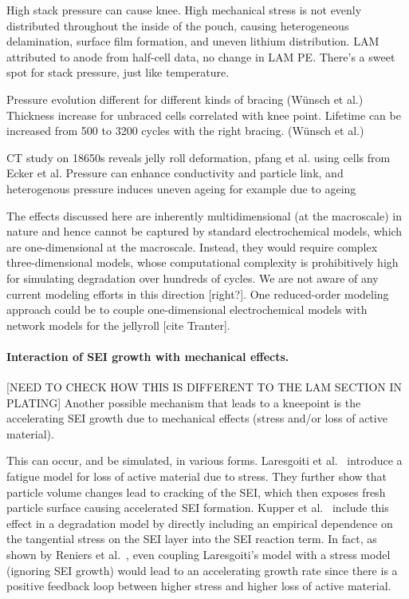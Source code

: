 \documentclass{article}
\begin{document}
High stack pressure can cause knee. High mechanical stress is not evenly distributed throughout the inside of the pouch, causing heterogeneous delamination, surface film formation, and uneven lithium distribution. LAM attributed to anode from half-cell data, no change in LAM PE. There's a sweet spot for stack pressure, just like temperature.\cite{cannarella_stress_2014}

Pressure evolution different for different kinds of bracing (Wünsch et al.) Thickness increase for unbraced cells correlated with knee point. Lifetime can be increased from 500 to 3200 cycles with the right bracing. (Wünsch et al.)

CT study on 18650s reveals jelly roll deformation, pfang et al. \cite{pfrang_long-term_2018} using cells from Ecker et al. \cite{ecker_calendar_2014}
Pressure can enhance conductivity and particle link, and heterogenous pressure induces uneven ageing for example due to ageing \cite{bach_nonlinear_2016}

The effects discussed here are inherently multidimensional (at the macroscale) in nature and hence cannot be captured by standard electrochemical models, which are one-dimensional at the macroscale. Instead, they would require complex three-dimensional models, whose computational complexity is prohibitively high for simulating degradation over hundreds of cycles. We are not aware of any current modeling efforts in this direction [right?]. One reduced-order modeling approach could be to couple one-dimensional electrochemical models with network models for the jellyroll [cite Tranter].

\paragraph{Interaction of SEI growth with mechanical effects.} [NEED TO CHECK HOW THIS IS DIFFERENT TO THE LAM SECTION IN PLATING]
Another possible mechanism that leads to a kneepoint is the accelerating SEI growth due to mechanical effects (stress and/or loss of active material).

This can occur, and be simulated, in various forms.
Laresgoiti et al.~\cite{laresgoiti_modeling_2015} introduce a fatigue model for loss of active material due to stress. They further show that particle volume changes lead to cracking of the SEI, which then exposes fresh particle surface causing accelerated SEI formation. Kupper et al.~\cite{kupper_end--life_2018} include this effect in a degradation model by directly including an empirical dependence on the tangential stress on the SEI layer into the SEI reaction term. In fact, as shown by Reniers et al.~\cite{reniers_review_2019}, even coupling Laresgoiti's model with a stress model (ignoring SEI growth) would lead to an accelerating growth rate since there is a positive feedback loop between higher stress and higher loss of active material.
\end{document}
